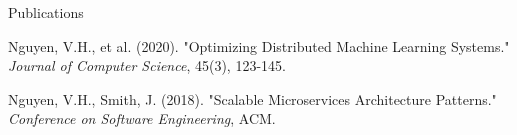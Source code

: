 \documentclass{resume} %
\begin{document}

\begin{rSection}{Publications}

Nguyen, V.H., et al. (2020). "Optimizing Distributed Machine Learning Systems." \textit{Journal of Computer Science}, 45(3), 123-145.

Nguyen, V.H., Smith, J. (2018). "Scalable Microservices Architecture Patterns." \textit{Conference on Software Engineering}, ACM.

\end{rSection}





\end{document}
